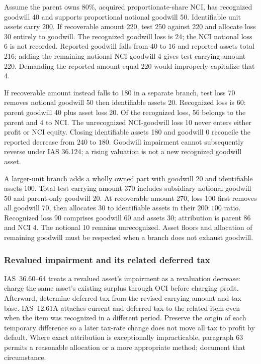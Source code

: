Assume the parent owns 80\%, acquired proportionate-share NCI, has recognized goodwill 40 and supports proportional notional goodwill 50. Identifiable unit assets carry 200. If recoverable amount 220, test 250 against 220 and allocate loss 30 entirely to goodwill. The recognized goodwill loss is 24; the NCI notional loss 6 is not recorded. Reported goodwill falls from \(40\) to \(16\) and reported assets total 216; adding the remaining notional NCI goodwill 4 gives test carrying amount 220. Demanding the reported amount equal 220 would improperly capitalize that 4.

If recoverable amount instead falls to 180 in a separate branch, test loss 70 removes notional goodwill 50 then identifiable assets 20. Recognized loss is 60: parent goodwill 40 plus asset loss 20. Of the recognized loss, 56 belongs to the parent and 4 to NCI. The unrecognized NCI-goodwill loss 10 never enters either profit or NCI equity. Closing identifiable assets 180 and goodwill 0 reconcile the reported decrease from \(240\) to \(180\). Goodwill impairment cannot subsequently reverse under IAS 36.124; a rising valuation is not a new recognized goodwill asset.

A larger-unit branch adds a wholly owned part with goodwill 20 and identifiable assets 100. Total test carrying amount 370 includes subsidiary notional goodwill 50 and parent-only goodwill 20. At recoverable amount 270, loss 100 first removes all goodwill 70, then allocates 30 to identifiable assets in their \(200:100\) ratio. Recognized loss 90 comprises goodwill 60 and assets 30; attribution is parent 86 and NCI 4. The notional 10 remains unrecognized. Asset floors and allocation of remaining goodwill must be respected when a branch does not exhaust goodwill.

\hypertarget{revalued-impairment-and-its-related-deferred-tax}{%
\subsubsection{Revalued impairment and its related deferred tax}\label{revalued-impairment-and-its-related-deferred-tax}}

IAS~36.60--64 \citep[IAS~36.60--64,117--124; IAS~12.61A--65]{eu20231803} treats a revalued asset's impairment as a revaluation decrease: charge the same asset's existing surplus through OCI before charging profit. Afterward, determine deferred tax from the revised carrying amount and tax base. IAS~12.61A attaches current and deferred tax to the related item even when the item was recognized in a different period. Preserve the origin of each temporary difference so a later tax-rate change does not move all tax to profit by default. Where exact attribution is exceptionally impracticable, paragraph 63 permits a reasonable allocation or a more appropriate method; document that circumstance.

